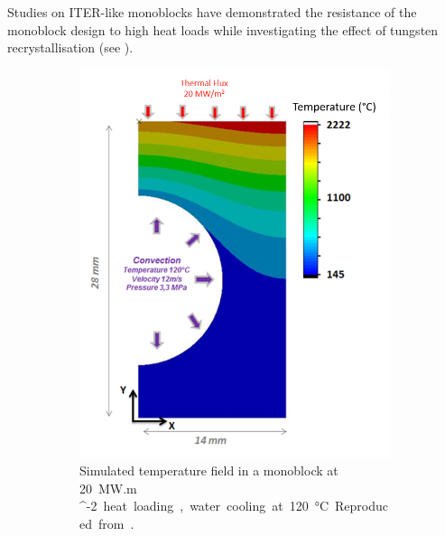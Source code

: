 Studies on ITER-like monoblocks have demonstrated the resistance of the monoblock design to high heat loads while investigating the effect of tungsten recrystallisation  (see ).

\begin{figure} [h]
    \centering
    \begin{subfigure}[t]{0.45\linewidth}
            \includegraphics[width=\linewidth]{Figures/Chapter1/alan_durif_monoblock.png}
            \caption{Simulated temperature field in a monoblock at \SI{20}{MW.m ^{-2}} heat loading, water cooling at \SI{120}{\celsius}. Reproduced from \cite{durif_modelisation_2019}.}
    \end{subfigure}\hfill%
    \begin{subfigure}[t]{0.45\linewidth}

\end{subfigure}
\end{figure}
